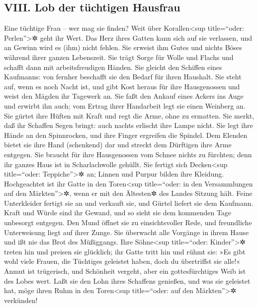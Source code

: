\hypertarget{viii.-lob-der-tuxfcchtigen-hausfrau}{%
\subsection{VIII. Lob der tüchtigen
Hausfrau}\label{viii.-lob-der-tuxfcchtigen-hausfrau}}

Eine tüchtige Frau -- wer mag sie finden? Weit über
Korallen\textless sup title=``oder: Perlen''\textgreater✲ geht ihr Wert.
Das Herz ihres Gatten kann sich auf sie verlassen, und an
Gewinn wird es (ihm) nicht fehlen. Sie erweist ihm Gutes
und nichts Böses während ihrer ganzen Lebenszeit. Sie
trägt Sorge für Wolle und Flachs und schafft dann mit arbeitsfreudigen
Händen. Sie gleicht den Schiffen eines Kaufmanns: von
fernher beschafft sie den Bedarf für ihren Haushalt. Sie
steht auf, wenn es noch Nacht ist, und gibt Kost heraus für ihre
Hausgenossen und weist den Mägden ihr Tagewerk an. Sie
faßt den Ankauf eines Ackers ins Auge und erwirbt ihn auch; vom Ertrag
ihrer Handarbeit legt sie einen Weinberg an. Sie gürtet
ihre Hüften mit Kraft und regt die Arme, ohne zu ermatten.
Sie merkt, daß ihr Schaffen Segen bringt: auch nachts
erlischt ihre Lampe nicht. Sie legt ihre Hände an den
Spinnrocken, und ihre Finger ergreifen die Spindel. Dem
Elenden bietet sie ihre Hand (schenkend) dar und streckt dem Dürftigen
ihre Arme entgegen. Sie braucht für ihre Hausgenossen vom
Schnee nichts zu fürchten; denn ihr ganzes Haus ist in Scharlachwolle
gehüllt. Sie fertigt sich Decken\textless sup
title=``oder: Teppiche''\textgreater✲ an; Linnen und Purpur bilden ihre
Kleidung. Hochgeachtet ist ihr Gatte in den
Toren\textless sup title=``oder: in den Versammlungen auf den
Märkten''\textgreater✲, wenn er mit den Ältesten✲ des Landes Sitzung
hält. Feine Unterkleider fertigt sie an und verkauft sie,
und Gürtel liefert sie dem Kaufmann. Kraft und Würde sind
ihr Gewand, und so sieht sie dem kommenden Tage unbesorgt entgegen.
Den Mund öffnet sie zu einsichtsvoller Rede, und
freundliche Unterweisung liegt auf ihrer Zunge. Sie
überwacht alle Vorgänge in ihrem Hause und ißt nie das Brot des
Müßiggangs. Ihre Söhne\textless sup title=``oder:
Kinder''\textgreater✲ treten hin und preisen sie glücklich; ihr Gatte
tritt hin und rühmt sie: »Es gibt wohl viele Frauen, die
Tüchtiges geleistet haben, doch du übertriffst sie alle!«
Anmut ist trügerisch, und Schönheit vergeht, aber ein
gottesfürchtiges Weib ist des Lobes wert. Laßt sie den
Lohn ihres Schaffens genießen, und was sie geleistet hat, möge ihren
Ruhm in den Toren\textless sup title=``oder: auf den
Märkten''\textgreater✲ verkünden!
